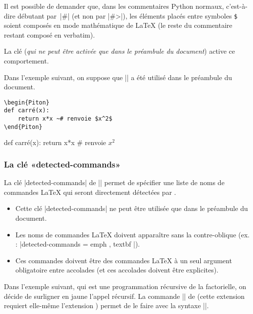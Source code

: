 \documentclass[dvipsnames,svgnames]{article}
\begin{document}

Il est possible de demander que, dans les commentaires Python normaux, c'est-à-dire débutant par~|#| (et non par
|#>|), les éléments placés entre symboles \texttt{\$} soient composés en mode mathématique de LaTeX (le reste du
commentaire restant composé en verbatim).

La clé  (\emph{qui ne peut être activée que dans le préambule du document}) active ce
comportement.

\bigskip
Dans l'exemple suivant, on suppose que || a été utilisé dans le préambule du document.

\begin{Verbatim}
\begin{Piton}
def carré(x):
    return x*x ~# renvoie $x^2$
\end{Piton}
\end{Verbatim}

\begin{Piton}
def carré(x):
    return x*x # renvoie $x^2$
\end{Piton}


\subsubsection{La clé «detected-commands»}

\label{detected-commands}

La clé |detected-commands| de |\PitonOptions| permet de spécifier une liste de noms de commandes LaTeX qui seront
directement détectées par .

\begin{itemize}
\item Cette clé |detected-commands| ne peut être utilisée que dans le préambule du document.

\item Les noms de commandes LaTeX doivent apparaître sans la contre-oblique 
(ex. : |detected-commands = { emph , textbf }|). 

\item Ces commandes doivent être des commandes LaTeX à un seul argument obligatoire entre accolades (et ces
accolades doivent être explicites).
\end{itemize}

\medskip
Dans l'exemple suivant, qui est une programmation récursive de la factorielle, on décide de surligner en jaune
l'appel récursif. La commande |\highLight| de  (cette extension requiert elle-même l'extension
) permet de le faire avec la syntaxe ||.
\end{document}
